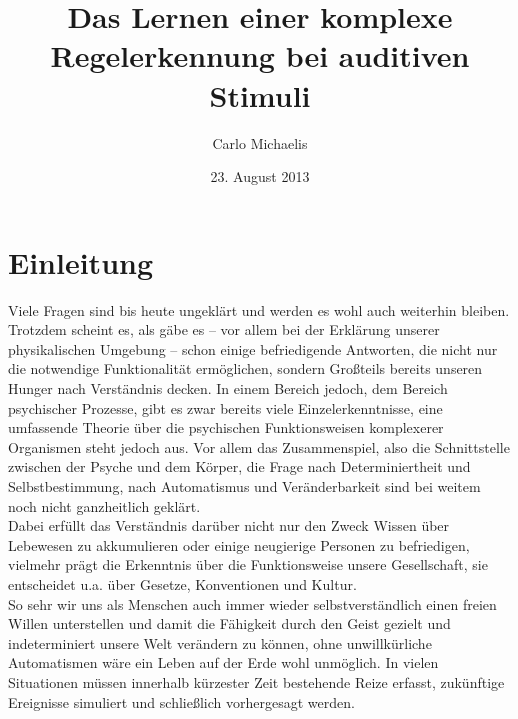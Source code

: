 \documentclass[doc,a4paper,12pt]{apa6}
\title{Das Lernen einer komplexe Regelerkennung bei auditiven Stimuli}
\author{Carlo Michaelis}
\date{23. August 2013}
\affiliation{Universität Leipzig}
\begin{document}


\section{Einleitung}

Viele Fragen sind bis heute ungeklärt und werden es wohl auch weiterhin bleiben. Trotzdem scheint es, als gäbe es – vor allem bei der Erklärung unserer physikalischen Umgebung – schon einige befriedigende Antworten, die nicht nur die notwendige Funktionalität ermöglichen, sondern Großteils bereits unseren Hunger nach Verständnis decken. In einem Bereich jedoch, dem Bereich psychischer Prozesse, gibt es zwar bereits viele Einzelerkenntnisse, eine umfassende Theorie über die psychischen Funktionsweisen komplexerer Organismen steht jedoch aus. Vor allem das Zusammenspiel, also die Schnittstelle zwischen der Psyche und dem Körper, die Frage nach Determiniertheit und Selbstbestimmung, nach Automatismus und Veränderbarkeit sind bei weitem noch nicht ganzheitlich geklärt.\\
Dabei erfüllt das Verständnis darüber nicht nur den Zweck Wissen über Lebewesen zu akkumulieren oder einige neugierige Personen zu befriedigen, vielmehr prägt die Erkenntnis über die Funktionsweise unsere Gesellschaft, sie entscheidet u.a. über Gesetze, Konventionen und Kultur.\\
So sehr wir uns als Menschen auch immer wieder selbstverständlich einen freien Willen unterstellen und damit die Fähigkeit durch den Geist gezielt und indeterminiert unsere Welt verändern zu können, ohne unwillkürliche Automatismen wäre ein Leben auf der Erde wohl unmöglich. In vielen Situationen müssen innerhalb kürzester Zeit bestehende Reize erfasst, zukünftige Ereignisse simuliert und schließlich vorhergesagt werden.
\end{document}
